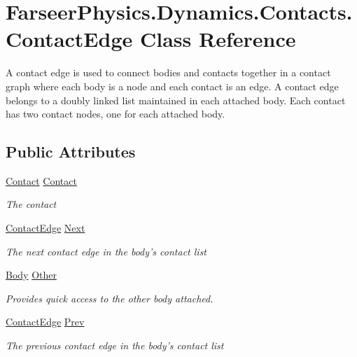 \hypertarget{class_farseer_physics_1_1_dynamics_1_1_contacts_1_1_contact_edge}{\section{Farseer\+Physics.\+Dynamics.\+Contacts.\+Contact\+Edge Class Reference}
\label{class_farseer_physics_1_1_dynamics_1_1_contacts_1_1_contact_edge}
}


A contact edge is used to connect bodies and contacts together in a contact graph where each body is a node and each contact is an edge. A contact edge belongs to a doubly linked list maintained in each attached body. Each contact has two contact nodes, one for each attached body.  


\subsection*{Public Attributes}
\begin{DoxyCompactItemize}
\item 
\hyperlink{class_farseer_physics_1_1_dynamics_1_1_contacts_1_1_contact}{Contact} \hyperlink{class_farseer_physics_1_1_dynamics_1_1_contacts_1_1_contact_edge_a30c6cb2b2fa7ce6611b05b90d67763ba}{Contact}
\begin{DoxyCompactList}\small\item\em The contact \end{DoxyCompactList}\item 
\hyperlink{class_farseer_physics_1_1_dynamics_1_1_contacts_1_1_contact_edge}{Contact\+Edge} \hyperlink{class_farseer_physics_1_1_dynamics_1_1_contacts_1_1_contact_edge_a6d8d2781180055765af80b3f736b9ecc}{Next}
\begin{DoxyCompactList}\small\item\em The next contact edge in the body's contact list \end{DoxyCompactList}\item 
\hyperlink{class_farseer_physics_1_1_dynamics_1_1_body}{Body} \hyperlink{class_farseer_physics_1_1_dynamics_1_1_contacts_1_1_contact_edge_a8b441e56fbb8b5a5bb20f2cbeb2752d0}{Other}
\begin{DoxyCompactList}\small\item\em Provides quick access to the other body attached. \end{DoxyCompactList}\item 
\hyperlink{class_farseer_physics_1_1_dynamics_1_1_contacts_1_1_contact_edge}{Contact\+Edge} \hyperlink{class_farseer_physics_1_1_dynamics_1_1_contacts_1_1_contact_edge_a0f0f00948e496e0f4e965ee2bc5e28f0}{Prev}
\begin{DoxyCompactList}\small\item\em The previous contact edge in the body's contact list \end{DoxyCompactList}\end{DoxyCompactItemize}


